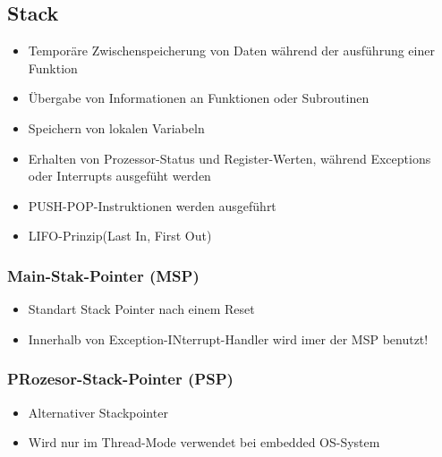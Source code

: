 \subsection{Stack}
\begin{multicols}{2}
\begin{minipage}{0.5\textwidth}
    \begin{itemize}
        \item Temporäre Zwischenspeicherung von Daten während der ausführung einer Funktion
        \item Übergabe von Informationen an Funktionen oder Subroutinen
        \item Speichern von lokalen Variabeln
        \item Erhalten von Prozessor-Status und Register-Werten, während Exceptions oder Interrupts ausgefüht werden
        \item PUSH-POP-Instruktionen werden ausgeführt
        \item LIFO-Prinzip(Last In, First Out)
    \end{itemize}
\end{minipage}

\begin{minipage}{0.5\textwidth}
    \subsubsection{Main-Stak-Pointer (MSP)}
    \begin{itemize}
        \item Standart Stack Pointer nach einem Reset
        \item Innerhalb von Exception-INterrupt-Handler wird imer der MSP benutzt!
        \end{itemize}
    \subsubsection{PRozesor-Stack-Pointer (PSP)}
    \begin{itemize}
        \item Alternativer Stackpointer
        \item Wird nur im Thread-Mode verwendet
        \subitem \rightarrow bei embedded OS-System
    \end{itemize}   
\end{minipage}
\end{multicols}

















